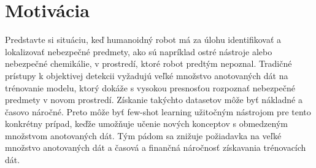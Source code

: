 \chapter{Motivácia}\label{chap:motivation}
Predstavte si situáciu, keď humanoidný robot má za úlohu identifikovať a lokalizovať nebezpečné predmety, ako sú napríklad ostré nástroje alebo nebezpečné chemikálie, v prostredí, ktoré robot predtým nepoznal. Tradičné prístupy k objektivej detekcii vyžadujú veľké množstvo anotovaných dát na trénovanie modelu, ktorý dokáže s vysokou presnosťou rozpoznať nebezpečné predmety v novom prostredí. Získanie takýchto datasetov môže byť nákladné a časovo náročné. Preto môže byť few-shot learning užitočným nástrojom pre tento konkrétny prípad, keďže umožňuje učenie nových konceptov s obmedzeným množstvom anotovaných dát. Tým pádom sa znižuje požiadavka na veľké množstvo anotovaných dát a časová a finančná náročnosť získavania trénovacích dát.
